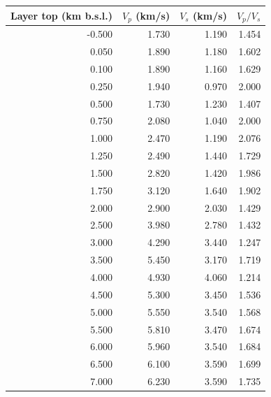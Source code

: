 \begin{longtable}{rrrr}\toprule Layer top (km b.s.l.) & $V_p$ (km/s) & $V_s$ (km/s) & $V_p/V_s$\\\midrule\endhead
-0.500 & 1.730 & 1.190 & 1.454\\
0.050 & 1.890 & 1.180 & 1.602\\
0.100 & 1.890 & 1.160 & 1.629\\
0.250 & 1.940 & 0.970 & 2.000\\
0.500 & 1.730 & 1.230 & 1.407\\
0.750 & 2.080 & 1.040 & 2.000\\
1.000 & 2.470 & 1.190 & 2.076\\
1.250 & 2.490 & 1.440 & 1.729\\
1.500 & 2.820 & 1.420 & 1.986\\
1.750 & 3.120 & 1.640 & 1.902\\
2.000 & 2.900 & 2.030 & 1.429\\
2.500 & 3.980 & 2.780 & 1.432\\
3.000 & 4.290 & 3.440 & 1.247\\
3.500 & 5.450 & 3.170 & 1.719\\
4.000 & 4.930 & 4.060 & 1.214\\
4.500 & 5.300 & 3.450 & 1.536\\
5.000 & 5.550 & 3.540 & 1.568\\
5.500 & 5.810 & 3.470 & 1.674\\
6.000 & 5.960 & 3.540 & 1.684\\
6.500 & 6.100 & 3.590 & 1.699\\
7.000 & 6.230 & 3.590 & 1.735\\
\bottomrule\end{longtable}
